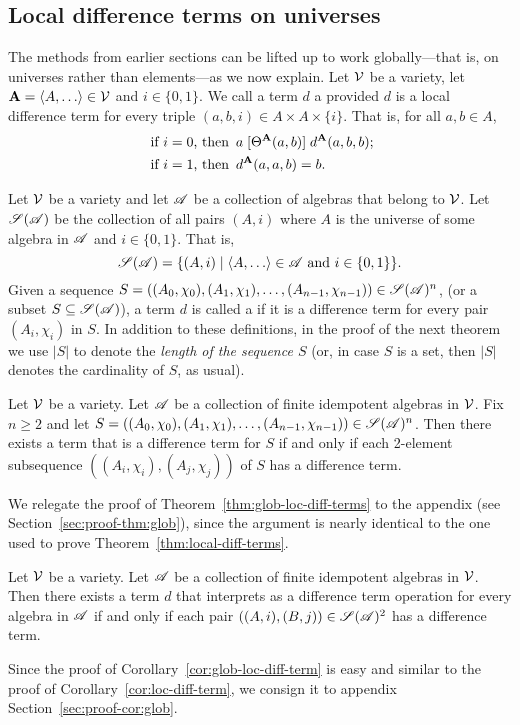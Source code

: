 \subsection{Local difference terms on universes}
\label{sec:glob-local-diff}
The methods from earlier sections can be lifted up to work globally---that is,
on universes rather than elements---as we now explain.
Let $\mathcal{V}$ be a variety, let $\bA = \<A, \dots\> \in \sV$
and $i\in \{0,1\}$.
We call a term $d$ a 
provided $d$ is a local difference term for every triple
$(a,b,i) \in A \times A \times \{i\}$. That is, for all $a, b \in A$,
\begin{align}
\text{ if $i=0$, then } & \, a \mathrel{[\Theta^{\mathbf{A}}(a,b)]} d^{\mathbf{A}}(a,b,b);
\label{eq:global-diff-triple}\\
\text{ if $i=1$, then } & \,
d^{\mathbf{A}}(a,a,b) = b.
\end{align}

Let $\mathcal{V}$ be a variety and let $\mathscr{A}$ be a collection of algebras that belong to $\mathcal{V}$.
Let $\mathscr{S}(\mathscr{A})$ be the collection of all pairs $(A, i)$ where $A$ is the universe
of some algebra in $\mathscr{A}$ and $i\in \{0,1\}$.  That is,
\[
\scS(\scA) = \{(A, i) \mid \<A, \dots\> \in \scA \text{ and } i \in \{0,1\}\}.
\]
Given a sequence
$S = ((A_0, \chi_0), (A_1, \chi_1), \dots,
(A_{n-1},\chi_{n-1})) \in \mathscr{S}(\mathscr{A})^n$,
(or a subset $S \subseteq \mathscr{S}(\mathscr{A})$),
a term $d$ is called a 
if it is a \glocal difference term for every pair $(A_i, \chi_i)$ in $S$.
In addition to these definitions, in the proof of the next theorem we use
$|S|$ to denote the \emph{length of the sequence $S$}
(or, in case $S$ is a set, then $|S|$ denotes the cardinality of $S$, as usual).
\begin{thm}
  \label{thm:glob-loc-diff-terms}
  Let $\mathcal{V}$ be a variety.  Let $\mathscr{A}$ be a collection of finite idempotent
  algebras in $\mathcal{V}$. Fix $n\geq 2$ and
  let $S= ((A_0, \chi_0), (A_1, \chi_1), \dots, (A_{n-1}, \chi_{n-1}))\in \mathscr{S}(\mathscr{A})^n$.
  Then there exists a term that is a \glocal difference term for $S$
  if and only if each 2-element subsequence $((A_i,\chi_i), (A_j,\chi_j))$ of $S$
  has a \glocal difference term.
\end{thm}
We relegate the proof of Theorem~\ref{thm:glob-loc-diff-terms}
to the appendix (see Section~\ref{sec:proof-thm:glob}), since the argument
is nearly identical to the one used to prove Theorem~\ref{thm:local-diff-terms}.

\begin{cor}
  \label{cor:glob-loc-diff-term}
  Let $\mathcal{V}$ be a variety.  Let $\mathscr{A}$ be a collection of finite idempotent
  algebras in $\mathcal{V}$. %
  Then there exists a term $d$ that interprets as a difference term operation
  for every algebra in $\mathscr{A}$
  if and only if each pair $((A,i), (B,j)) \in \mathscr{S}(\mathscr{A})^2$ has a \glocal
  difference term.
\end{cor}
Since the proof of Corollary~\ref{cor:glob-loc-diff-term}
is easy and similar to the proof
of Corollary~\ref{cor:loc-diff-term}, we consign it to
appendix Section~\ref{sec:proof-cor:glob}.

